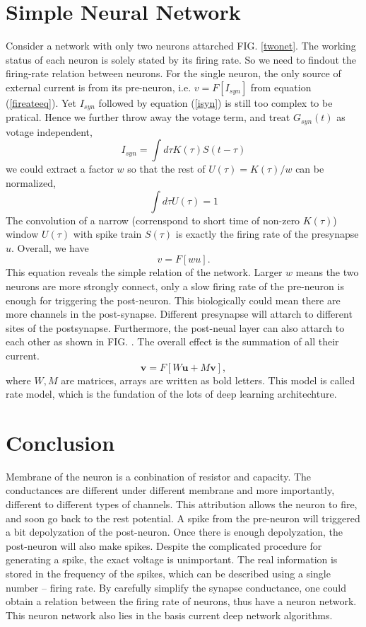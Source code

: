 \documentclass[11pt]{article}
\begin{document}
\section{Simple Neural Network}
Consider a network with only two neurons attarched FIG. \ref{twonet}. The
working status of each neuron is solely stated by its firing rate. So we need to
findout the firing-rate relation between neurons. For the single neuron, the only source of external current is from its
pre-neuron, i.e. $v = F[I_{syn}]$ from equation (\ref{fireateeq}). Yet $I_{syn}$
followed by equation (\ref{isyn}) is still
too complex to be pratical. Hence we further throw away the votage term, and
treat $G_{syn}(t)$ as votage independent,
\begin{equation}
  I_{syn} = \int{d\tau}K(\tau)S(t - \tau)
\end{equation}
we could extract a factor $w$ so that the rest of $U(\tau) = K(\tau) / w$ can be normalized,
\begin{equation}
  \int{d\tau}U(\tau) = 1 
\end{equation}
The convolution of a narrow (correnspond to short time of non-zero $K(\tau)$)
window $U(\tau)$ with spike train $S(\tau)$ is exactly the firing rate of the
presynapse $u$. Overall, we have
\begin{equation}
  v = F[w u].
\end{equation}
This equation reveals the simple relation of the network. Larger $w$ means the
two neurons are more strongly connect, only a slow firing rate of the pre-neuron
is enough for triggering the post-neuron. This biologically could mean there are more
channels in the post-synapse. Different presynapse will attarch to different
sites of the postsynapse. Furthermore, the post-neual layer can also attarch to
each other as shown in FIG. . The overall effect is the summation of all their
current.
\begin{equation}
  \boldsymbol{v} = F[W\boldsymbol{u} + M \boldsymbol{v}],
\end{equation}
where $W, M$ are matrices, arrays are written as bold letters. This model is
called rate model, which is the fundation of the lots of deep learning
architechture.

\section{Conclusion}
Membrane of the neuron is a conbination of resistor and capacity. The
conductances are different under different membrane and more importantly,
different to different types of channels. This attribution allows the neuron to
fire, and soon go back to the rest potential. A spike
from the pre-neuron 
will triggered a bit depolyzation of the post-neuron. Once there is enough
depolyzation, the post-neuron will also make spikes.
 Despite the complicated procedure
for generating a spike, the exact voltage is unimportant. The real information is stored in the frequency of
the spikes, which can be described using a single number -- firing rate. By
carefully simplify the synapse conductance, one could obtain a relation between
the firing rate of neurons, thus have a neuron network. This neuron network
also lies in the basis current deep network algorithms.
\end{document}
